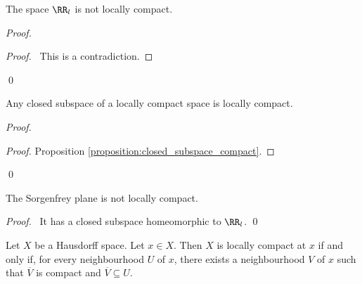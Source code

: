 \begin{example}
    The space $\RR_l$ is not locally compact.

    \begin{proof}
        \pf
        \step{2}{\pick\ $a > 0$ such that $[0,a) \subseteq U$}
        \step{4}{\pflet{$UU = \{ [0,a_1), [a_1,a_2), [a_2,a_3), \ldots \} \cup \{ \RR_l - [0,a) \}$}}
        \qedstep
        \begin{proof}
            \pf\ This is a contradiction.
        \end{proof}
        \qed
    \end{proof}
\end{example}

\begin{proposition}
    \label{proposition:closed_subspace_locally_compact}
    Any closed subspace of a locally compact space is locally compact.
\end{proposition}

\begin{proof}
    \pf
    \begin{proof}
        \pf Proposition \ref{proposition:closed_subspace_compact}.
    \end{proof}
    \qed
\end{proof}

\begin{corollary}
    The Sorgenfrey plane is not locally compact.
\end{corollary}

\begin{proof}
    \pf\ It has a closed subspace homeomorphic to $\RR_l$. \qed
\end{proof}

\begin{proposition}
    \label{proposition:locally_compact_neighbourhood}
    Let $X$ be a Hausdorff space. Let $x \in X$. Then $X$ is locally compact at $x$ if and only if,
    for every neighbourhood $U$ of $x$, there exists a neighbourhood $V$ of $x$ such that
    $\overline{V}$ is compact and $\overline{V} \subseteq U$.
\end{proposition}

